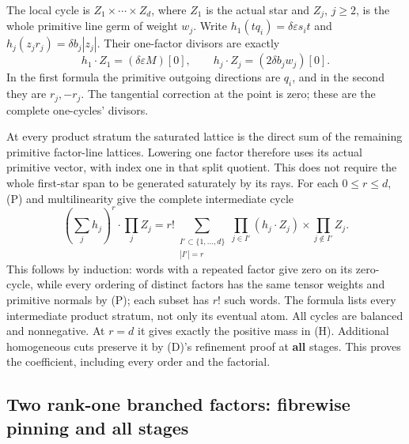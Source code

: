 \documentclass[
  11pt,
]{article}
\begin{document}
The local cycle is \(Z_1\times\cdots\times Z_d\), where \(Z_1\) is the
actual star and \(Z_j\), \(j\geq2\), is the whole primitive line germ of
weight \(w_j\). Write \(h_1(tq_i)=\delta\varepsilon s_it\) and
\(h_j(z_jr_j)=\delta b_j|z_j|\). Their one-factor divisors are exactly
\[
 h_1\cdot Z_1=(\delta\varepsilon M)[0],\qquad
 h_j\cdot Z_j=(2\delta b_jw_j)[0].
 \tag{A1}
\] In the first formula the primitive outgoing directions are \(q_i\),
and in the second they are \(r_j,-r_j\). The tangential correction at
the point is zero; these are the complete one-cycles' divisors.

At every product stratum the saturated lattice is the direct sum of the
remaining primitive factor-line lattices. Lowering one factor therefore
uses its actual primitive vector, with index one in that split quotient.
This does not require the whole first-star span to be generated
saturately by its rays. For each \(0\leq r\leq d\), (P) and
multilinearity give the complete intermediate cycle \[
 (\sum_jh_j)^r\cdot\prod_jZ_j
 =r!\sum_{\substack{I'\subset\{1,\ldots,d\}\\|I'|=r}}
       \prod_{j\in I'}(h_j\cdot Z_j)\times\prod_{j\notin I'}Z_j.
 \tag{A2}
\] This follows by induction: words with a repeated factor give zero on
its zero-cycle, while every ordering of distinct factors has the same
tensor weights and primitive normals by (P); each subset has \(r!\) such
words. The formula lists every intermediate product stratum, not only
its eventual atom. All cycles are balanced and nonnegative. At \(r=d\)
it gives exactly the positive mass in (H). Additional homogeneous cuts
preserve it by (D)'s refinement proof at \textbf{all} stages. This
proves the coefficient, including every order and the factorial.

\subsection{Two rank-one branched factors: fibrewise pinning and all
stages}\label{two-rank-one-branched-factors-fibrewise-pinning-and-all-stages}
\end{document}
